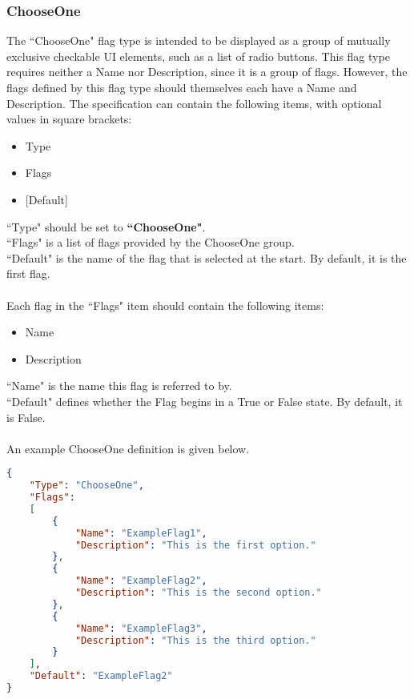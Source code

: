 \documentclass{article}
\begin{document}
\subsubsection{ChooseOne}
The ``ChooseOne" flag type is intended to be displayed as a group of mutually exclusive checkable UI elements, such as a list of radio buttons. This flag type requires neither a Name nor Description, since it is a group of flags. However, the flags defined by this flag type should themselves each have a Name and Description. The specification can contain the following items, with optional values in square brackets:
\begin{itemize}
\item Type
\item Flags
\item {[Default]}
\end{itemize}
``Type" should be set to \textbf{``ChooseOne"}.\\
``Flags" is a list of flags provided by the ChooseOne group.\\
``Default" is the name of the flag that is selected at the start. By default, it is the first flag.\\\\
Each flag in the ``Flags" item should contain the following items:
\begin{itemize}
\item Name
\item Description
\end{itemize}
``Name" is the name this flag is referred to by.\\
``Default" defines whether the Flag begins in a True or False state. By default, it is False.\\\\
An example ChooseOne definition is given below.
\newpage
\begin{lstlisting}[language=json,firstnumber=1]
{
    "Type": "ChooseOne",
    "Flags":
    [
        {
            "Name": "ExampleFlag1",
            "Description": "This is the first option."
        },
        {
            "Name": "ExampleFlag2",
            "Description": "This is the second option."
        },
        {
            "Name": "ExampleFlag3",
            "Description": "This is the third option."
        }
    ],
    "Default": "ExampleFlag2"
}
\end{lstlisting}
\newpage
\end{document}
